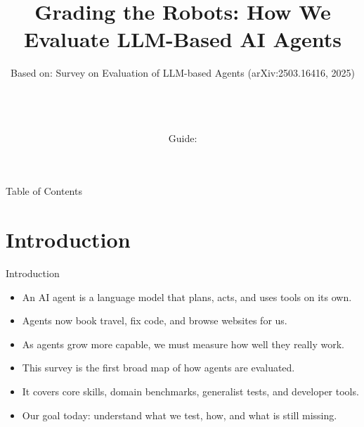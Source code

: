 \documentclass[10pt]{beamer}
\title[B.Tech Seminar]{Grading the Robots: How We Evaluate LLM-Based AI Agents}
\subtitle{Based on: Survey on Evaluation of LLM-based Agents (arXiv:2503.16416, 2025)}
\author[\studentname\ (\shortinst)]{\studentname \\ \small \rollno \\ \small \rollclass \\ \small Guide: \guidename}
\institute[]{\deptname \\ \collegename}
\date{\seminardate}
\begin{document}
\begin{frame}[plain]
  \titlepage
\end{frame}
\begin{frame}{Table of Contents}
  \tableofcontents
\end{frame}
\section{Introduction}
\begin{frame}{Introduction}
\begin{itemize}
  \item An AI agent is a language model that plans, acts, and uses tools on its own.
  \item Agents now book travel, fix code, and browse websites for us.
  \item As agents grow more capable, we must measure how well they really work.
  \item This survey is the first broad map of how agents are evaluated.
  \item It covers core skills, domain benchmarks, generalist tests, and developer tools.
  \item Our goal today: understand what we test, how, and what is still missing.
\end{itemize}
\end{frame}
\end{document}
